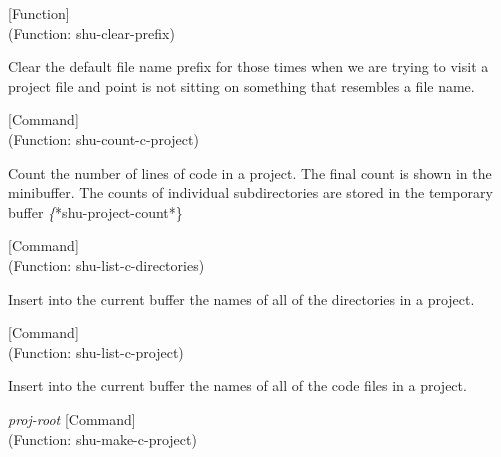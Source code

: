 \vspace{1em}
\noindent
{}
\usebox{\funcname}
 \hfill [Function]\\%
 (Function: shu-clear-prefix)

\begin{doc-string}
Clear the default file name prefix for those times when we are trying to visit
a project file and point is not sitting on something that resembles a file name.
\end{doc-string}

\vspace{1em}
\noindent
{}
\usebox{\funcname}
 \hfill [Command]\\%
 (Function: shu-count-c-project)

\begin{doc-string}
Count the number of lines of code in a project.  The final count is shown in
the minibuffer.  The counts of individual subdirectories are stored in the
temporary buffer \emph\{*shu-project-count*\}
\end{doc-string}

\vspace{1em}
\noindent
{}
\usebox{\funcname}
 \hfill [Command]\\%
 (Function: shu-list-c-directories)

\begin{doc-string}
Insert into the current buffer the names of all of the directories in a project.
\end{doc-string}

\vspace{1em}
\noindent
{}
\usebox{\funcname}
 \hfill [Command]\\%
 (Function: shu-list-c-project)

\begin{doc-string}
Insert into the current buffer the names of all of the code files in a project.
\end{doc-string}

\vspace{1em}
\noindent
{}
\usebox{\funcname}\emph{proj-root}
 \hfill [Command]\\%
 (Function: shu-make-c-project)

